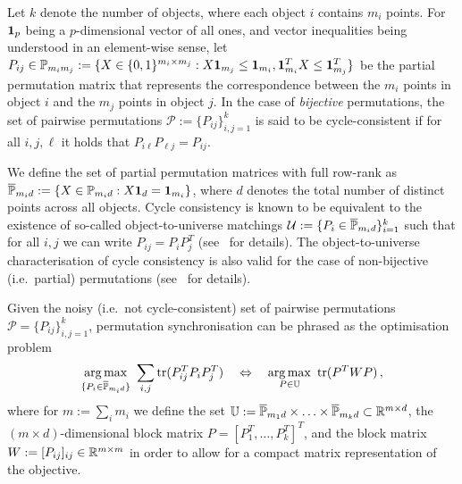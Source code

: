 \documentclass{article}
\begin{document}
Let $k$ denote the number of objects, where each object $i$ contains $m_i$ points. For $\mathbf{1}_p$ being a $p$-dimensional vector of all ones, and vector inequalities being understood in an element-wise sense, let $P_{ij} \in \mathbb{P}_{m_im_j} := \{ X \in \{0,1\}^{m_i \times m_j}: X \mathbf{1}_{m_j} \leq \mathbf{1}_{m_i}, \mathbf{1}_{m_i}^T X \leq \mathbf{1}_{m_j}^T\}$ be the partial permutation matrix that represents the correspondence between the $m_i$ points in object $i$ and the $m_j$ points in object $j$. In the case of \emph{bijective} permutations, the set of pairwise permutations $\mathcal{P} := \{P_{ij}\}_{i,j=1}^k$ is said to be cycle-consistent if for all $i,j,\ell$ it holds that $P_{i\ell} P_{\ell j} = P_{ij}$. 

We define the set of %
partial permutation matrices with full row-rank as $\overline{\mathbb{P}}_{m_i d} := \{ X \in \mathbb{P}_{m_id}: X \mathbf{1}_{d} = \mathbf{1}_{m_i}\}$, where $d$ denotes the total number of distinct points across all objects. Cycle consistency is known to be equivalent to the existence of so-called object-to-universe matchings $\mathcal{U} := \{P_i \in \overline{\mathbb{P}}_{m_i d}\}_{i=1}^k$ such that for all $i,j$ we can write $P_{ij} = P_i P_j^T$ (see~\cite{Huang:2013uk,Pachauri:2013wx} for details).
%
The object-to-universe characterisation of cycle consistency is also valid for the case of non-bijective (i.e.~partial) permutations (see~\cite{tron2017fast,bernard2019synchronisation} for details).

Given the noisy (i.e.~not cycle-consistent) set of pairwise permutations $\mathcal{P} = \{P_{ij}\}_{i,j=1}^k$, permutation synchronisation can be phrased as the optimisation problem
\begin{align}\label{eq:permsync}
    \operatorname*{arg\,max}_{\{P_i \in \overline{\mathbb{P}}_{m_i d}\}}~\sum_{i,j} \operatorname{tr}(P_{ij}^T P_i P_j^T) \quad \Leftrightarrow \quad
    \operatorname*{arg\,max}_{P \in \mathbb{U}}~\operatorname{tr}(P^T W P)\,,
\end{align}
where for $m := \sum_i m_i$  we define the set $\mathbb{U} := \overline{\mathbb{P}}_{m_1d} \times \ldots \times \overline{\mathbb{P}}_{m_kd} \subset \mathbb{R}^{m \times d}$, the $(m {\times} d)$-dimensional block matrix $P = [P_1^T,\ldots,P_k^T]^T$, and the block matrix $W := [P_{ij}]_{ij} \in \mathbb{R}^{m \times m}$ in order to allow for a compact matrix representation of the objective.
%

%
\end{document}
